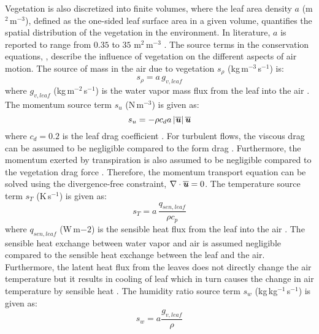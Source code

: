 Vegetation is also discretized into finite volumes, where the leaf area density $a$ (m$^2$\,m$^{-3}$), defined as the one-sided leaf surface area in a given volume, quantifies the spatial distribution of the vegetation in the environment. In literature, $a$ is reported to range from $0.35$ to $35$ m$^2$\,m$^{-3}$ \citep{Kenjeres2013, Liang2006}. The source terms in the conservation equations, , describe the influence of vegetation on the different aspects of air motion. The source of mass in the air due to vegetation $s_\rho$ (kg\,m$^{-3}$\,s$^{-1}$) is:
	\begin{equation}
	s_\rho = a \, {g_{v,\mathit{leaf}}}
	\label{eq:source_density}
	\end{equation}
where $g_{v,leaf}$ (kg\,m$^{-2}$\,s$^{-1}$) is the water vapor mass flux from the leaf into the air \citep{Hiraoka2005}. The momentum source term $s_u$ (N\,m$^{-3}$) is given as:
	\begin{equation}
	s_u =  - \rho {c_d}a\left| \overline{\textbf{\textit{u}}} \right|\overline{\textbf{\textit{u}}}
	\label{eq:source_mom}
	\end{equation}
where $c_d=0.2$ is the leaf drag coefficient \citep{Wilson1977}. For turbulent flows, the viscous drag can be assumed to be negligible compared to the form drag \citep{Judd1996, Li1990, Liu1996}. Furthermore, the momentum exerted by transpiration is also assumed to be negligible compared to the vegetation drag force \citep{Hiraoka2005}. Therefore, the momentum transport equation can be solved using the divergence-free constraint, $\nabla \cdot \overline{\textbf{\textit{u}}}=0$. The temperature source term $s_T$ (K\,s$^{-1}$) is given as:
	\begin{equation}
	s_T = a \, \frac{q_{\mathit{sen},\mathit{leaf}}}{\rho c_p}
	\label{eq:source_temp}	
	\end{equation}
where $q_{\mathit{sen},\mathit{leaf}}$  (W\,m$-2$) is the sensible heat flux from the leaf into the air \citep{Bruse1998, Hiraoka2005}. The sensible heat exchange between water vapor and air is assumed negligible compared to the sensible heat exchange between the leaf and the air. Furthermore, the latent heat flux from the leaves does not directly change the air temperature but it results in cooling of leaf which in turn causes the change in air temperature by sensible heat \citep{Hiraoka2005}. The humidity ratio source term $s_w$ (kg\,kg$^{-1}$\,s$^{-1}$) is given as:
	\begin{equation}
	s_w = a \frac{{{g_{v,\mathit{leaf}}}}}{\rho }
	\label{eq:source_humi}		
	\end{equation}

